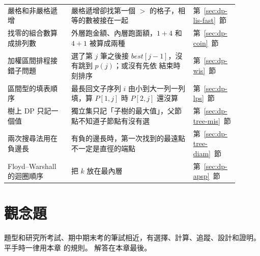 \begin{longtable}{p{0.25\linewidth}p{0.48\linewidth}>{\raggedright\arraybackslash}p{0.17\linewidth}}
嚴格和非嚴格遞增 & 嚴格遞增卻找第一個 $>$ 的格子，相等的數被接在一起 &
第~\ref{sec:dp-lis-fast}~節 \\
找零的組合數算成排列數 & 外層跑金額、內層跑面額，$1 + 4$ 和 $4 + 1$ 被算成兩種 &
第~\ref{sec:dp-coin}~節 \\
加權區間排程接錯子問題 & 選了第 $j$ 筆之後接 $\mathit{best}[j - 1]$，沒有跳到 $p(j)$；或沒有先依
結束時刻排序 & 第~\ref{sec:dp-wis}~節 \\
區間型的填表順序 & 最長回文子序列 $i$ 由小到大一列一列填，算 $P[1, j]$ 時 $P[2, j]$ 還沒算 &
第~\ref{sec:dp-lps}~節 \\
樹上 DP 只記一個值 & 獨立集只記「子樹的最大值」，父節點不知道子節點有沒有選 &
第~\ref{sec:dp-tree-mis}~節 \\
兩次搜尋法用在負邊長 & 有負的邊長時，第一次找到的最遠點不一定是直徑的端點 &
第~\ref{sec:dp-tree-diam}~節 \\
Floyd--Warshall 的迴圈順序 & 把 $k$ 放在最內層 & 第~\ref{sec:dp-apsp}~節 \\
\bottomrule
\end{longtable}

\section{觀念題}
\label{sec:dp-exercises}

題型和研究所考試、期中期末考的筆試相近，有選擇、計算、追蹤、設計和證明。 平手時一律用本章
的規則。 解答在本章最後。

